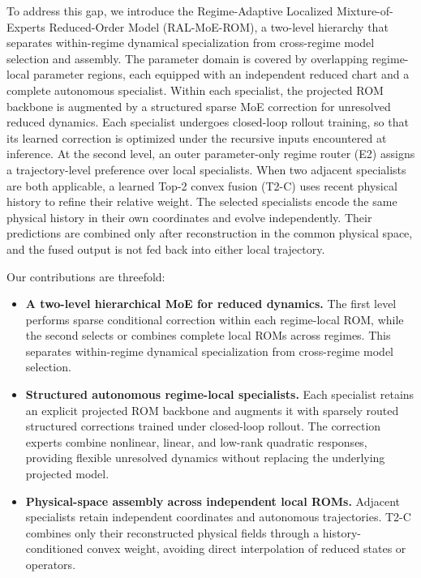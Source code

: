 \documentclass{article}
\begin{document}
To address this gap, we introduce the Regime-Adaptive Localized Mixture-of-Experts Reduced-Order Model (RAL-MoE-ROM), a two-level hierarchy that separates within-regime dynamical specialization from cross-regime model selection and assembly. The parameter domain is covered by overlapping regime-local parameter regions, each equipped with an independent reduced chart and a complete autonomous specialist. Within each specialist, the projected ROM backbone is augmented by a structured sparse MoE correction for unresolved reduced dynamics. Each specialist undergoes closed-loop rollout training, so that its learned correction is optimized under the recursive inputs encountered at inference. At the second level, an outer parameter-only regime router (E2) assigns a trajectory-level preference over local specialists. When two adjacent specialists are both applicable, a learned Top-2 convex fusion (T2-C) uses recent physical history to refine their relative weight. The selected specialists encode the same physical history in their own coordinates and evolve independently. Their predictions are combined only after reconstruction in the common physical space, and the fused output is not fed back into either local trajectory.


Our contributions are threefold:
\begin{itemize}
    \item \textbf{A two-level hierarchical MoE for reduced dynamics.}
    The first level performs sparse conditional correction within each
    regime-local ROM, while the second selects or combines complete local
    ROMs across regimes. This separates within-regime dynamical
    specialization from cross-regime model selection.

    \item \textbf{Structured autonomous regime-local specialists.}
    Each specialist retains an explicit projected ROM backbone and augments
    it with sparsely routed structured corrections trained under closed-loop
    rollout. The correction experts combine nonlinear, linear, and low-rank
    quadratic responses, providing flexible unresolved dynamics without
    replacing the underlying projected model.

    \item \textbf{Physical-space assembly across independent local ROMs.}
    Adjacent specialists retain independent coordinates and autonomous
    trajectories. T2-C combines only their reconstructed physical fields
    through a history-conditioned convex weight, avoiding direct
    interpolation of reduced states or operators.
\end{itemize}
\end{document}
